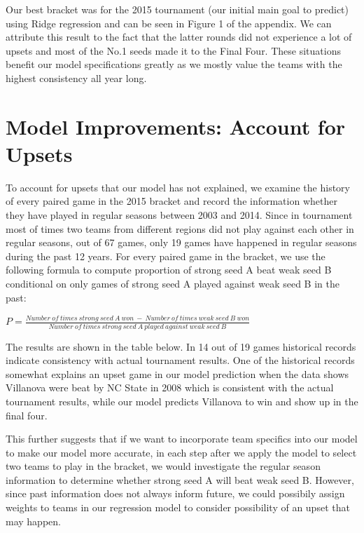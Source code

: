\documentclass{article} %
\begin{document}
Our best bracket was for the 2015 tournament (our initial main goal to predict) using Ridge regression and can be seen in Figure 1 of the appendix. We can attribute this result to the fact that the latter rounds did not experience a lot of upsets and most of the No.1 seeds made it to the Final Four. These situations benefit our model specifications greatly as we mostly value the teams with the highest consistency all year long.

\section{Model Improvements: Account for Upsets}

To account for upsets that our model has not explained, we examine the history of every paired game in the 2015 bracket and record the information whether they have played in regular seasons between 2003 and 2014. Since in tournament most of times two teams from different regions did not play against each other in regular seasons, out of 67 games, only 19 games have happened in regular seasons during the past 12 years. For every paired game in the bracket, we use the following formula to compute proportion of strong seed A beat weak seed B conditional on only games of strong seed A played against weak seed B in the past:

$P=\frac{Number \ of \ times \ strong \ seed \ A \ won \ - \ Number \ of \ times \ weak \ seed \ B \ won}{Number \ of \ times \ strong \ seed \ A \ played \ against \ weak \ seed \ B }$


The results are shown in the table below. In 14 out of 19 games historical records indicate consistency with actual tournament results. One of the historical records somewhat explains an upset game in our model prediction when the data shows Villanova were beat by NC State in 2008 which is consistent with the actual tournament results, while our model predicts Villanova to win and show up in the final four. 

This further suggests that if we want to incorporate team specifics into our model to make our model more accurate, in each step after we apply the model to select two teams to play in the bracket, we would investigate the regular season information to determine whether strong seed A will beat weak seed B. However, since past information does not always inform future, we could possibily assign weights to teams in our regression model to consider possibility of an upset that may happen. 
\end{document}
